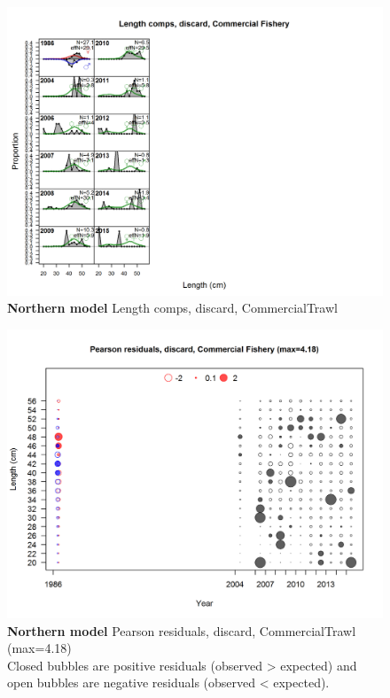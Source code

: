 \documentclass[12pt,]{article}
\begin{document}
\begin{figure}[htbp]
\centering
\includegraphics{./r4ss/plots_mod1/comp_lenfit_flt1mkt1.png}
\caption{\textbf{Northern model} Length comps, discard, CommercialTrawl
\label{fig:mod1_6_comp_lenfit_flt1mkt1}}
\end{figure}

\begin{figure}[htbp]
\centering
\includegraphics{./r4ss/plots_mod1/comp_lenfit_residsflt1mkt1.png}
\caption{\textbf{Northern model} Pearson residuals, discard,
CommercialTrawl (max=4.18)\\
Closed bubbles are positive residuals (observed \textgreater{} expected)
and open bubbles are negative residuals (observed \textless{} expected).
\label{fig:mod1_7_comp_lenfit_residsflt1mkt1}}
\end{figure}
\end{document}
